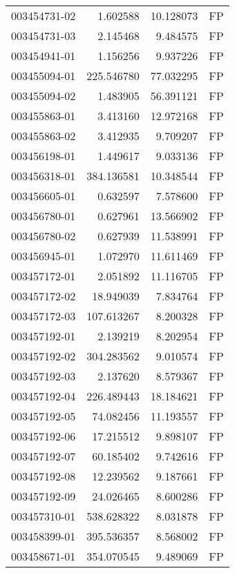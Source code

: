 \begin{tabular}{lrrl}
003454731-02 &    1.602588 &      10.128073 &   FP \\
003454731-03 &    2.145468 &       9.484575 &   FP \\
003454941-01 &    1.156256 &       9.937226 &   FP \\
003455094-01 &  225.546780 &      77.032295 &   FP \\
003455094-02 &    1.483905 &      56.391121 &   FP \\
003455863-01 &    3.413160 &      12.972168 &   FP \\
003455863-02 &    3.412935 &       9.709207 &   FP \\
003456198-01 &    1.449617 &       9.033136 &   FP \\
003456318-01 &  384.136581 &      10.348544 &   FP \\
003456605-01 &    0.632597 &       7.578600 &   FP \\
003456780-01 &    0.627961 &      13.566902 &   FP \\
003456780-02 &    0.627939 &      11.538991 &   FP \\
003456945-01 &    1.072970 &      11.611469 &   FP \\
003457172-01 &    2.051892 &      11.116705 &   FP \\
003457172-02 &   18.949039 &       7.834764 &   FP \\
003457172-03 &  107.613267 &       8.200328 &   FP \\
003457192-01 &    2.139219 &       8.202954 &   FP \\
003457192-02 &  304.283562 &       9.010574 &   FP \\
003457192-03 &    2.137620 &       8.579367 &   FP \\
003457192-04 &  226.489443 &      18.184621 &   FP \\
003457192-05 &   74.082456 &      11.193557 &   FP \\
003457192-06 &   17.215512 &       9.898107 &   FP \\
003457192-07 &   60.185402 &       9.742616 &   FP \\
003457192-08 &   12.239562 &       9.187661 &   FP \\
003457192-09 &   24.026465 &       8.600286 &   FP \\
003457310-01 &  538.628322 &       8.031878 &   FP \\
003458399-01 &  395.536357 &       8.568002 &   FP \\
003458671-01 &  354.070545 &       9.489069 &   FP \\

\end{tabular}
